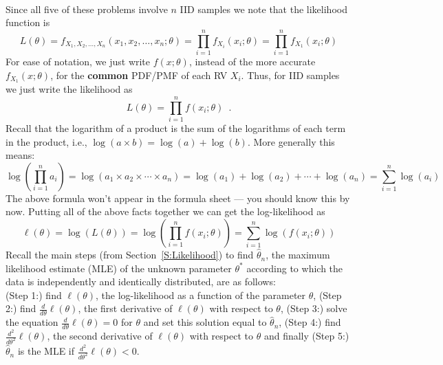 \begin{Answer}
~\\
Since all five of these problems involve $n$ IID samples we note that the likelihood function is
\[
L(\theta) = f_{X_1,X_2,\ldots,X_n}(x_1,x_2,\ldots,x_n; \theta)
= \prod_{i=1}^n f_{X_i}(x_i;\theta) = \prod_{i=1}^n f_{X_1}(x_i;\theta)
\]
For ease of notation, we just write $f(x;\theta)$, instead of the more accurate $f_{X_1}(x;\theta)$, for the {\bf common} PDF/PMF of each RV $X_i$.  Thus, for IID samples we just write the likelihood as
\[
L(\theta) = \prod_{i=1}^n f(x_i;\theta) \enspace.
\] 
Recall that the logarithm of a product is the sum of the logarithms of each term in the product, i.e., $\log(a \times b) = \log(a)+\log(b)$.  
More generally this means: 
$$\log\left(\prod_{i=1}^n a_i\right) = \log\left( a_1 \times a_2 \times \cdots \times a_n\right) = \log(a_1)+\log(a_2)+\cdots+\log(a_n)=\sum_{i=1}^n \log(a_i)$$
The above formula won't appear in the formula sheet --- you should know this by now.
Putting all of the above facts together we can get the log-likelihood as
\[
\ell(\theta) = \log \left( L(\theta) \right) = \log \left( \prod_{i=1}^n f(x_i;\theta) \right) 
= \sum_{i=1}^n \log\left(f(x_i;\theta)\right)
\] 
Recall the main steps (from Section~\ref{S:Likelihood}) to find $\widehat{\theta}_n$, the maximum likelihood estimate (MLE) of the unknown parameter $\theta^*$ according to which the data is independently and identically distributed, are as follows:\\ 
({\sf Step 1:}) find $\ell(\theta)$, the log-likelihood as a function of the parameter $\theta$, 
({\sf Step 2:}) find $\frac{d}{d \theta} \ell(\theta)$, the first derivative of $\ell(\theta)$ with respect to $\theta$, 
({\sf Step 3:}) solve the equation $\frac{d}{d \theta} \ell(\theta)=0$ for $\theta$ and set this solution equal to $\widehat{\theta}_n$, 
({\sf Step 4:}) find $\frac{d^2}{d \theta^2} \ell(\theta)$, the second derivative of $\ell(\theta)$ with respect to $\theta$ and finally 
({\sf Step 5:}) $\widehat{\theta}_n$ is the MLE if $\frac{d^2}{d \theta^2} \ell(\theta) < 0$.


\end{Answer}
